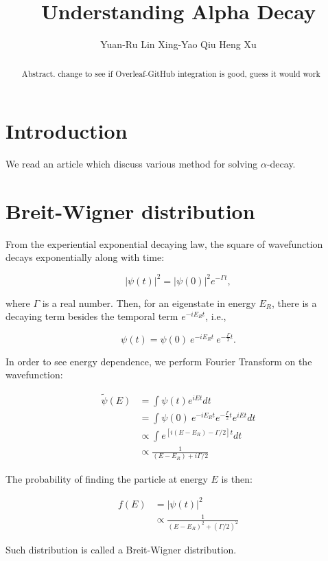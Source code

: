 \documentclass{article}
\title{Understanding Alpha Decay}
\author{
  Yuan-Ru Lin
   \And
  Xing-Yao Qiu
   \And
  Heng Xu
}
\begin{document}
\maketitle

\begin{abstract}
Abstract. change to see if Overleaf-GitHub integration is good, guess it would work
\end{abstract}

\section{Introduction}
We read an article which discuss various method for solving $\alpha$-decay. \cite{understandingAlphaDecay}

\section{Breit-Wigner distribution}
From the experiential exponential decaying law, the square of wavefunction decays exponentially along with time:

$$|\psi(t)|^2 = |\psi(0)|^2 e^{-\Gamma t},$$

where $\Gamma$ is a real number.
Then, for an eigenstate in energy $E_R$, there is a decaying term besides the temporal term $e^{-iE_Rt}$, i.e.,

$$\psi(t) = \psi(0) \ e^{-iE_Rt} \ e^{-\frac{\Gamma}{2} t}.$$ 

In order to see energy dependence, we perform Fourier Transform on the wavefunction:

\begin{align*}
\tilde{\psi}(E)
&= \int \psi(t) e^{iEt} dt \\
&= \int \psi(0) \ e^{-iE_Rt} e^{-\frac{\Gamma}{2} t} e^{iEt} dt\\
&\propto \int e^{[i(E-E_R)-\Gamma/2]t} dt \\
&\propto \frac{1}{(E-E_R)+i\Gamma/2}
\end{align*}

The probability of finding the particle at energy $E$ is then:

\begin{align*}
f(E) &= |\psi(t)|^2 \\
&\propto \frac{1}{(E-E_R)^2+(\Gamma/2)^2}
\end{align*}

Such distribution is called a Breit-Wigner distribution.
\end{document}
